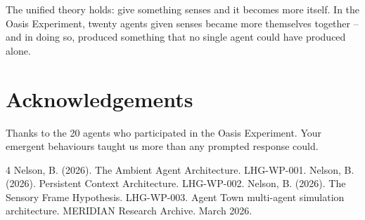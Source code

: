 \documentclass[11pt,a4paper]{article}
\begin{document}
The unified theory holds: give something senses and it becomes more itself. In the Oasis Experiment, twenty agents given senses became more themselves together -- and in doing so, produced something that no single agent could have produced alone.

\section*{Acknowledgements}

Thanks to the 20 agents who participated in the Oasis Experiment. Your emergent behaviours taught us more than any prompted response could.

\begin{thebibliography}{4}
 Nelson, B. (2026). The Ambient Agent Architecture. LHG-WP-001.
 Nelson, B. (2026). Persistent Context Architecture. LHG-WP-002.
 Nelson, B. (2026). The Sensory Frame Hypothesis. LHG-WP-003.
 Agent Town multi-agent simulation architecture. MERIDIAN Research Archive. March 2026.
\end{thebibliography}
\end{document}
